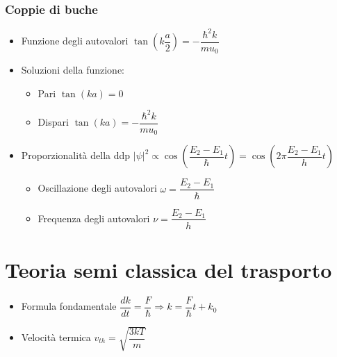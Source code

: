 \documentclass{article}
\begin{document}
\subsubsection{Coppie di buche}
\begin{itemize}
  \item Funzione degli autovalori \( \tan\left( k \dfrac{a}{2} \right) = - \dfrac{\hbar ^2 k}{m u_0} \)
  \item Soluzioni della funzione:
        \begin{itemize}
          \item Pari \( \tan \left( ka \right) = 0 \)
          \item Dispari \( \tan \left( ka \right) = - \dfrac{\hbar ^ 2 k}{m u_0}  \)
        \end{itemize}
  \item Proporzionalità della ddp \( \left| \psi \right| ^ 2 \propto \cos \left( \dfrac{E_2 - E_1}{\hbar} t \right) = \cos \left( 2 \pi \dfrac{E_2 - E_1}{h} t \right)  \)
        \begin{itemize}
          \item Oscillazione degli autovalori \( \omega = \dfrac{E_2 - E_1}{\hbar} \)
          \item Frequenza degli autovalori \( \nu = \dfrac{E_2 - E_1}{h} \)
        \end{itemize}
\end{itemize}

\newpage

\section{Teoria semi classica del trasporto}
\begin{itemize}
  \item Formula fondamentale \( \dfrac{dk}{dt} = \dfrac{F}{\hbar} \Rightarrow k = \dfrac{F}{\hbar} t + k_0 \)
  \item Velocità termica \( \displaystyle v_{th} = \sqrt{\dfrac{3 k T}{m}} \)
\end{itemize}
\end{document}
